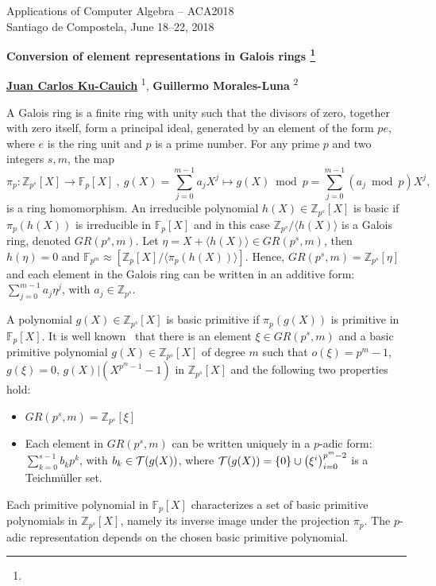\documentclass{article}
\makeatletter
\newcommand{\TITLE}[2][]{
  \begin{center} \Large \bfseries #2%
  \def\@temp{#1}\ifx\@temp\@empty\relax\else\footnote{#1}\fi\end{center}}
\newcommand{\AUTHOR}[2][]{\textbf{#2}%
  \def\@temp{#1}\ifx\@temp\@empty\relax\else\textsuperscript{#1}\fi}
\newcommand{\HEADING}{
{\noindent \small Applications of Computer Algebra -- ACA2018 \\
Santiago de Compostela, June 18--22, 2018} \vspace{10pt}}
\newcommand{\F}{\mathbb{F}}
\newcommand{\Z}{\mathbb{Z}}
\makeatother
\begin{document}
\HEADING


\TITLE{Conversion of element representations in Galois rings}




\begin{center}
 \AUTHOR[1]{\underline{Juan Carlos Ku-Cauich}}, %
 \AUTHOR[2]{Guillermo Morales-Luna}
\end{center}

A Galois ring is a finite ring with unity such that the divisors of zero, together with zero itself, form a principal ideal, generated by an element of the form $pe$, where $e$ is the ring unit and $p$ is a prime number. For any prime $p$ and two integers $s,m$, the map 
$$\pi_p:\Z_{p^s}[X] \to \F_p[X]\ ,\ g(X)=\sum_{j=0}^{m-1}a_jX^j\mapsto g(X)\bmod p = \sum_{j=0}^{m-1}(a_j\bmod p)X^j,$$ is a ring homomorphism. 
An irreducible polynomial $h(X)\in\Z_{p^s}[X]$ is basic if $\pi_p(h(X))$ is irreducible in $\F_p[X]$ and in this case $\Z_{p^s}/\langle h(X)\rangle$ is a Galois ring, denoted $GR(p^s,m)$.  Let $\eta=X+ \langle h(X)\rangle\in GR(p^s,m)$, then $h(\eta)=0$ and $\F_{p^m}\approx\left[\Z_p[X]/\langle \pi_p(h(X))\rangle\right]$. Hence, $GR(p^s,m)=\Z_{p^s}[\eta]$ and each element in the Galois ring can be written in an additive form: $\sum_{j=0}^{m-1}a_j\eta^j$, with $a_j\in\Z_{p^s}$.

A polynomial $g(X)\in\Z_{p^s}[X]$ is basic primitive if $\pi_p(g(X))$ is primitive in $\F_p[X]$. It is well known~\cite{w03} that there is an element $\xi\in GR(p^s,m)$ and a basic primitive polynomial $g(X)\in\Z_{p^s}[X]$ of degree $m$ such that $o(\xi)=p^m-1$, $g(\xi)=0$, $g(X)|(X^{{p^m}-1}-1)$ in $\Z_{p^s}[X]$  and the following two properties hold:
\begin{itemize}
\item  $GR(p^s,m)=\Z_{p^s}[\xi]$
\item  Each element in $GR(p^s,m)$ can be written uniquely in a $p$-adic form: $\sum_{k=0}^{s-1}b_k p^k$, with $b_k\in{\cal T}(g(X))$, where ${\cal T}(g(X)) = \{0\}\cup\left(\xi^i\right)_{i=0}^{p^m-2}$ is a Teichm\"uller set. 
\end{itemize}
Each primitive polynomial in $\F_p[X]$ characterizes a set of basic primitive polynomials in $\Z_{p^s}[X]$, namely its inverse image under the projection $\pi_p$. The $p$-adic representation depends on the chosen basic primitive polynomial.
\end{document}
